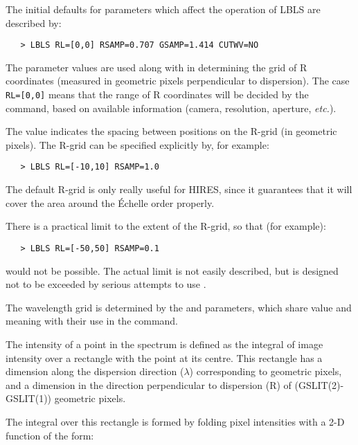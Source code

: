 The initial defaults for parameters which affect the operation of LBLS
are described by:

\begin{verbatim}
   > LBLS RL=[0,0] RSAMP=0.707 GSAMP=1.414 CUTWV=NO
\end{verbatim}

The 
 parameter values are used along with 
 in determining
the grid of R coordinates (measured in geometric pixels perpendicular to
dispersion)\@.  The case \verb+RL=[0,0]+ means that the range of R coordinates
will be decided by the 
 command, based on available information
(camera, resolution, aperture, {\it etc.})\@.

The 
 value indicates the spacing between positions on the R-grid
(in geometric pixels)\@.  The R-grid can be specified explicitly by, for
example:

\begin{verbatim}
   > LBLS RL=[-10,10] RSAMP=1.0
\end{verbatim}

The default R-grid is only really useful for HIRES, since it guarantees that it
will cover the area around the \'{E}chelle order properly.

There is a practical limit to the extent of the R-grid, so that (for example):

\begin{verbatim}
   > LBLS RL=[-50,50] RSAMP=0.1
\end{verbatim}

would not be possible.  The actual limit is not easily described,  but
is designed not to be exceeded by serious attempts to use
\@.

The wavelength grid is determined by the 
and  parameters, which share value and
meaning with their use in the  command.

The intensity of a point in the spectrum is defined as the integral of image
intensity over a rectangle with the point at its centre.  This rectangle has a
dimension along the dispersion  direction ($\lambda$) corresponding to
  geometric pixels, and a dimension in the direction perpendicular
to dispersion (R) of (GSLIT(2)-GSLIT(1)) geometric pixels.

The integral over this rectangle is formed by folding pixel intensities with a
2-D function of the form:


